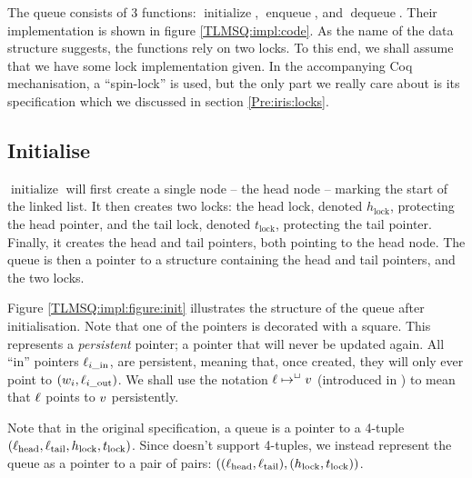 \documentclass[a4paper, 10pt]{report}
\theoremstyle{definition}
\newcommand{\initialise}{\operatorname{initialize}}
\newcommand{\enqueue}{\operatorname{enqueue}}
\newcommand{\dequeue}{\operatorname{dequeue}}
\newcommand{\locinM}[1]{\loc_{#1\_\mathrm{in}}}
\newcommand{\locoutM}[1]{\loc_{#1\_\mathrm{out}}}
\newcommand{\locN}[1]{\loc_{\mathrm{#1}}}
\newcommand{\lochead}{\locN{head}}
\newcommand{\loctail}{\locN{tail}}
\newcommand{\nodeval}{\valB}
\newcommand{\nodevalM}[1]{\nodeval_{#1}}
\newcommand{\Hlock}{h_{\mathrm{lock}}}
\newcommand{\Tlock}{t_{\mathrm{lock}}}
\begin{document}
The queue consists of 3 functions: $\initialise$, $\enqueue$, and $\dequeue$. Their implementation is shown in figure \ref{TLMSQ:impl:code}. As the name of the data structure suggests, the functions rely on two locks. To this end, we shall assume that we have some lock implementation given. In the accompanying Coq mechanisation, a ``spin-lock'' is used, but the only part we really care about is its specification which we discussed in section \ref{Pre:iris:locks}.

\subsection{Initialise}
\label{TLMSQ:implementation:sub:initialise}

$\initialise$ will first create a single node -- the head node -- marking the start of the linked list. It then creates two locks: the head lock, denoted $\Hlock$, protecting the head pointer, and the tail lock, denoted $\Tlock$, protecting the tail pointer. Finally, it creates the head and tail pointers, both pointing to the head node. The queue is then a pointer to a structure containing the head and tail pointers, and the two locks.

Figure \ref{TLMSQ:impl:figure:init} illustrates the structure of the queue after initialisation. Note that one of the pointers is decorated with a square. This represents a \emph{persistent} pointer; a pointer that will never be updated again. All ``in'' pointers $\locinM{i}$, are persistent, meaning that, once created, they will only ever point to $(\nodevalM{i}, \locoutM{i})$. We shall use the notation $\ell \mapsto^{\mathop{\Box}} v$ (introduced in \citet{DBLP:conf/cpp/VindumB21}) to mean that $\ell$ points to $v$ persistently.

Note that in the original specification, a queue is a pointer to a 4-tuple $(\lochead, \loctail, \Hlock, \Tlock)$. Since \heaplang doesn't support 4-tuples, we instead represent the queue as a pointer to a pair of pairs: $\left((\lochead, \loctail), (\Hlock, \Tlock)\right)$.
\end{document}
